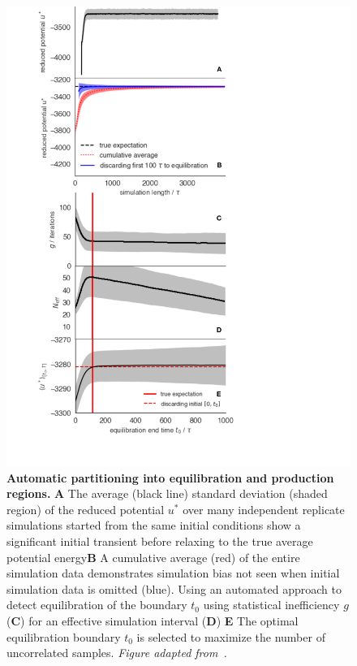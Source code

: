 \documentclass[9pt,bestpractices]{livecoms}
\begin{document}
\begin{figure}
    \centering
    \includegraphics[width=0.95\linewidth]{figures/fig11_equib_detection/Figure.pdf}
    \caption{{\bf Automatic partitioning into equilibration and production regions.}
    \textbf{A} The average (black line) standard deviation (shaded region) of the reduced potential $u^*$ over many independent replicate simulations started from the same initial conditions show a significant initial transient before relaxing to the true average potential energy\textbf{B} A cumulative average (red) of the entire simulation data demonstrates simulation bias not seen when initial simulation data is omitted (blue). Using an automated approach to detect equilibration of the boundary $t_0$ using statistical inefficiency $g$ (\textbf{C})  for an effective simulation interval (\textbf{D}) \textbf{E} The optimal equilibration boundary $t_0$ is selected to maximize the number of uncorrelated samples.
    \emph{Figure adapted from~\cite{chodera2016simple}.}
    }
    \label{fig:automatic-equilibration-detection}
\end{figure}
\end{document}
